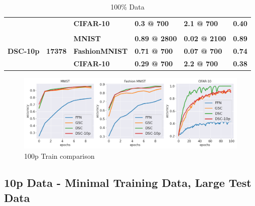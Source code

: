 \documentclass{article}
\begin{document}
\begin{table}[H]
\begin{tabular}{llllll}
\textbf{}                         & \textbf{}                       & \textbf{CIFAR-10}        & \textbf{0.3 @ 700}   & \textbf{2.1 @ 700}   & \textbf{0.40}            \\
                                  &                                 &                          &                      &                      &                          \\
\multirow{3}{*}{\textbf{DSC-10p}} & \multirow{3}{*}{\textbf{17378}} & \textbf{MNIST}           & \textbf{0.89 @ 2800} & \textbf{0.02 @ 2100} & \textbf{0.89}            \\
                                  &                                 & \textbf{FashionMNIST}    & \textbf{0.71 @ 700}  & \textbf{0.07 @ 700}  & \textbf{0.74}            \\
                                  &                                 & \textbf{CIFAR-10}        & \textbf{0.29 @ 700}  & \textbf{2.2 @ 700}   & \textbf{0.38}            \\ \cmidrule(l){3-6} 
\end{tabular}
\caption{100\% Data}
\label{tab:my-table}
\end{table}



\begin{figure}[h!]
\centering
\includegraphics[scale=0.4]{paper/100p_runs.png}
\caption{100p Train comparison}
\label{fig:infotransfer}
\end{figure}




\subsection{10p Data - Minimal Training Data, Large Test Data}
\end{document}
